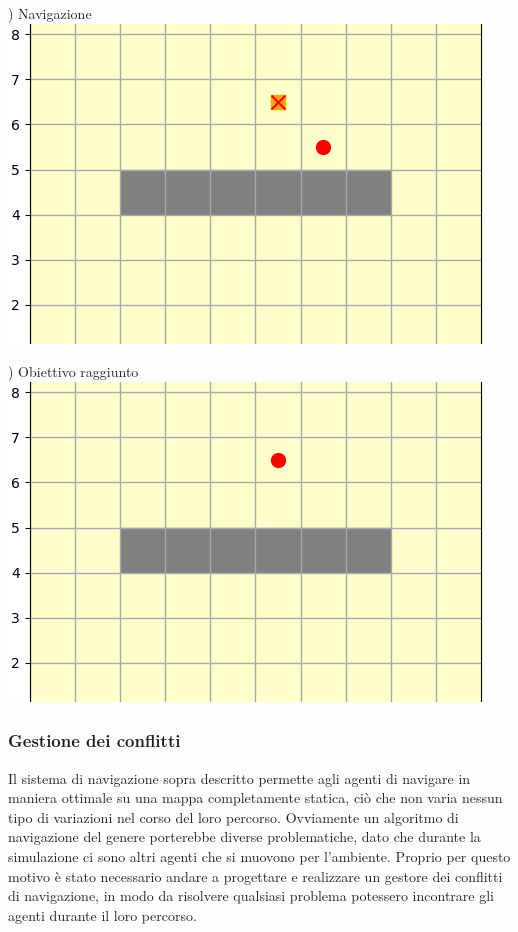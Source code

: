 \documentclass[12pt]{article}
\begin{document}
\noindent \begin{minipage}[ht]{0.45\linewidth}
) Navigazione
\includegraphics[width=\textwidth]{SimulazioniNavigazione/1AGV_Walls/4.png}
\end{minipage}
\begin{minipage}[ht]{0.45\linewidth}
) Obiettivo raggiunto
\includegraphics[width=\textwidth]{SimulazioniNavigazione/1AGV_Walls/5.png}
\end{minipage}

\newpage

\subsubsection{Gestione dei conflitti}
Il sistema di navigazione sopra descritto permette agli agenti di navigare in maniera ottimale su una mappa completamente statica, ciò che non varia nessun tipo di variazioni nel corso del loro percorso. Ovviamente un algoritmo di navigazione del genere porterebbe diverse problematiche, dato che durante la simulazione ci sono altri agenti che si muovono per l'ambiente. Proprio per questo motivo è stato necessario andare a progettare e realizzare un gestore dei conflitti di navigazione, in modo da risolvere qualsiasi problema potessero incontrare gli agenti durante il loro percorso.\\
\end{document}
